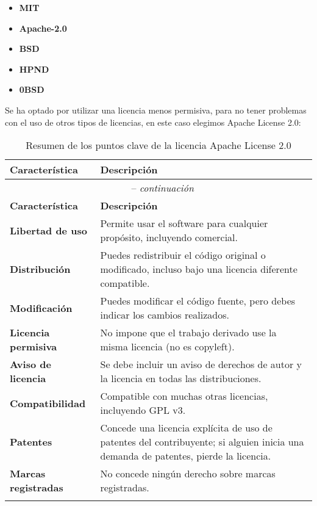 \begin{itemize}
    \item \textbf{MIT}
    \item \textbf{Apache-2.0}
    \item \textbf{BSD}
    \item \textbf{HPND}
    \item \textbf{0BSD}
\end{itemize}

Se ha optado por utilizar una licencia menos permisiva, para no tener problemas con el uso de otros tipos de licencias,
en este caso elegimos Apache License 2.0\cite{apacheLicense}:

\begin{longtable}[]{@{}p{}p{}@{}}
    \toprule
    \textbf{Característica} & \textbf{Descripción} \\
    \midrule
    \endfirsthead

    \multicolumn{2}{c}{\tablename\ \thetable{} -- \textit{continuación}} \\
    \toprule
    \textbf{Característica} & \textbf{Descripción} \\
    \midrule
    \endhead

    \textbf{Libertad de uso} & Permite usar el software para cualquier propósito, incluyendo comercial. \\
    \textbf{Distribución} & Puedes redistribuir el código original o modificado, incluso bajo una licencia diferente compatible. \\
    \textbf{Modificación} & Puedes modificar el código fuente, pero debes indicar los cambios realizados. \\
    \textbf{Licencia permisiva} & No impone que el trabajo derivado use la misma licencia (no es copyleft). \\
    \textbf{Aviso de licencia} & Se debe incluir un aviso de derechos de autor y la licencia en todas las distribuciones. \\
    \textbf{Compatibilidad} & Compatible con muchas otras licencias, incluyendo GPL v3. \\
    \textbf{Patentes} & Concede una licencia explícita de uso de patentes del contribuyente; si alguien inicia una demanda de patentes, pierde la licencia. \\
    \textbf{Marcas registradas} & No concede ningún derecho sobre marcas registradas. \\
    \bottomrule
    \caption{Resumen de los puntos clave de la licencia Apache License 2.0}
\end{longtable}

